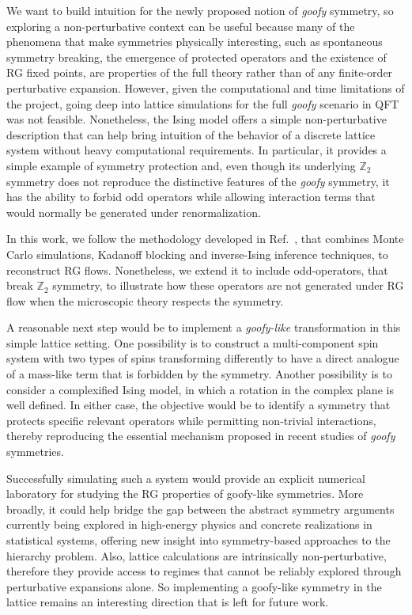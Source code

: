 \documentclass[a4paper, 11pt]{article}
\begin{document}
We want to build intuition for the newly proposed notion of \textit{goofy} symmetry, so exploring a non-perturbative context can be useful because many of the phenomena that make symmetries physically interesting, such as spontaneous symmetry breaking, the emergence of protected operators and the existence of RG fixed points, are properties of the full theory rather than of any finite-order perturbative expansion.  However, given the computational and time limitations of the project, going deep into lattice simulations for the full \textit{goofy} scenario in QFT was not feasible. Nonetheless, the Ising model offers a simple non-perturbative description that can help bring intuition of the behavior of a discrete lattice system without heavy computational requirements. In particular, it provides a simple example of symmetry protection and, even though its underlying $\mathbb{Z}_2$ symmetry does not reproduce the distinctive features of the \textit{goofy} symmetry, it has the ability to forbid odd operators while allowing interaction terms that would normally be generated under renormalization.

In this work, we follow the methodology developed in Ref.~\cite{blocking}, that combines Monte Carlo simulations, Kadanoff blocking and inverse-Ising inference techniques, to reconstruct RG flows. Nonetheless, we extend it to include odd-operators, that break $\mathbb{Z}_2$ symmetry, to illustrate how these operators are not generated under RG flow when the microscopic theory respects the symmetry.

A reasonable next step would be to implement a \textit{goofy-like} transformation in this simple lattice setting. One possibility is to construct a multi-component spin system with two types of spins transforming differently to have a direct analogue of a mass-like term that is forbidden by the symmetry. Another possibility is to consider a complexified Ising model, in which a rotation in the complex plane is well defined. In either case, the objective would be to identify a symmetry that protects specific relevant operators while permitting non-trivial interactions, thereby reproducing the essential mechanism proposed in recent studies of \textit{goofy} symmetries.

Successfully simulating such a system would provide an explicit numerical laboratory for studying the RG properties of goofy-like symmetries. More broadly, it could help bridge the gap between the abstract symmetry arguments currently being explored in high-energy physics and concrete realizations in statistical systems, offering new insight into symmetry-based approaches to the hierarchy problem. Also, lattice calculations are intrinsically non-perturbative, therefore they provide access to regimes that cannot be reliably explored through perturbative expansions alone. So implementing a goofy-like symmetry in the lattice remains an interesting direction that is left for future work.
\end{document}
